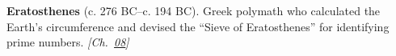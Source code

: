 \textbf{Eratosthenes} (c. 276 BC–c. 194 BC). Greek polymath who calculated the Earth's circumference and devised the ``Sieve of Eratosthenes'' for identifying prime numbers. \emph{[Ch.~\hyperref[ch:boundedprimegaps]{08}]}

